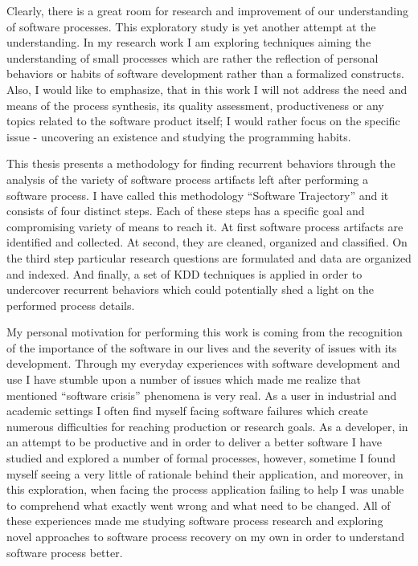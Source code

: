 Clearly, there is a great room for research and improvement of our understanding of software processes.
This exploratory study is yet another attempt at the understanding. In my research work I am 
exploring techniques aiming the understanding of small processes which are 
rather the reflection of personal behaviors or habits of software development rather than a 
formalized constructs. Also, I would like to emphasize, that in this work I will not 
address the need and means of the process synthesis, its quality assessment, productiveness
or any topics related to the software product itself; I would rather focus on the specific issue - 
uncovering an existence and studying the programming habits. 

This thesis presents a methodology for finding recurrent behaviors through the 
analysis of the variety of software process artifacts left after performing a 
software process. I have called this methodology ``Software Trajectory'' and it consists 
of four distinct steps. Each of these steps has a specific goal and compromising variety of 
means to reach it. 
At first software process artifacts are identified and collected. 
At second, they are cleaned, organized and classified. 
On the third step particular research questions are formulated and data are organized and indexed. 
And finally, a set of KDD techniques is applied in order to undercover recurrent behaviors which 
could potentially shed a light on the performed process details. 

My personal motivation for performing this work is coming from the recognition of the 
importance of the software in our lives and the severity of issues with its development. 
Through my everyday experiences with software development and use I have stumble upon 
a number of issues which made me realize that mentioned ``software crisis'' phenomena is very real.
As a user in industrial and academic settings I often find myself facing software failures 
which create numerous difficulties for reaching production or research goals. As a developer, 
in an attempt to be productive and in order to deliver a better software I have studied and 
explored a number of formal processes, however, sometime I found myself seeing a very little of 
rationale behind their application, and moreover, in this exploration, when facing the process
application failing to help I was unable to comprehend what exactly went wrong and what need 
to be changed. All of these experiences made me studying software process research and exploring
novel approaches to software process recovery on my own in order to understand software process better.

